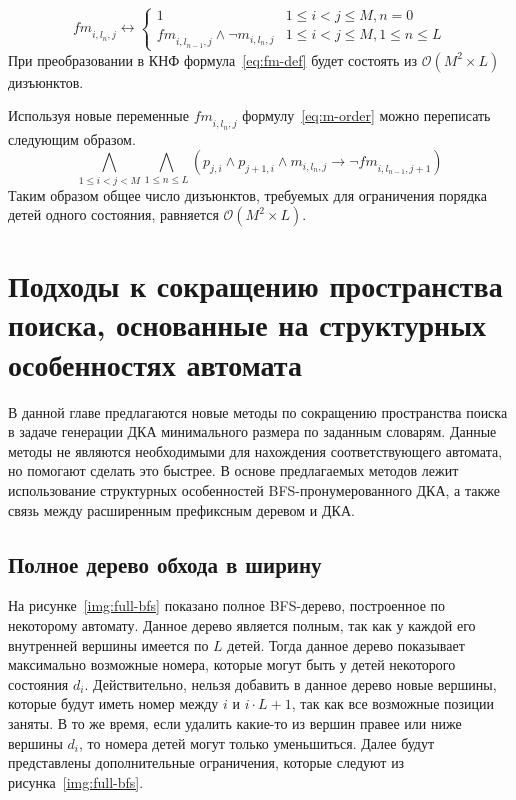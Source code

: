 \begin{equation}
\label{eq:fm-def}
  \mathit{fm}_{i,l_{n},j} \leftrightarrow 
    \begin{cases} 
      1                               & 1 \leq i < j \leq M, n = 0 \\
      \mathit{fm}_{i,l_{n - 1},j} \wedge \neg m_{i,l_{n},j}  & 1 \leq i < j \leq M, 1 \leq n \leq L
    \end{cases} 
\end{equation}
%
При преобразовании в КНФ формула~\eqref{eq:fm-def} будет состоять из $\mathcal{O}\left(M^{2} \times L\right)$ дизъюнктов.

Используя новые переменные $\mathit{fm}_{i,l_{n},j}$ формулу~\eqref{eq:m-order} можно переписать следующим образом.
%
\begin{equation}
\label{eq:m-order-tight}
  \bigwedge_{1 \leq i < j < M} \bigwedge_{1 \leq n \leq L} \left(p_{j,i} \wedge p_{j + 1, i} \wedge m_{i,l_{n}, j} \rightarrow \neg \mathit{fm}_{i, l_{n - 1}, j + 1}\right)
\end{equation}
%
Таким образом общее число дизъюнктов, требуемых для ограничения порядка детей одного состояния, равняется $\mathcal{O}\left(M^{2} \times L\right)$. 


\section{Подходы к сокращению пространства поиска, основанные на структурных особенностях автомата} 
\label{sec:space:pruning}

В данной главе предлагаются новые методы по сокращению пространства поиска в задаче генерации ДКА минимального размера по заданным словарям. 
Данные методы не являются необходимыми для нахождения соответствующего автомата, но помогают сделать это быстрее.
В основе предлагаемых методов лежит использование структурных особенностей BFS-пронумерованного ДКА, а также связь между расширенным префиксным деревом и ДКА.

\subsection{Полное дерево обхода в ширину}
\label{sec:space:pruning:bfs-tree}

На рисунке~\ref{img:full-bfs} показано полное BFS-дерево, построенное по некоторому автомату.
Данное дерево является полным, так как у каждой его внутренней вершины имеется по $L$ детей.
Тогда данное дерево показывает максимально возможные номера, которые могут быть у детей некоторого состояния $d_{i}$.
Действительно, нельзя добавить в данное дерево новые вершины, которые будут иметь номер между $i$ и $i \cdot L + 1$, так как все возможные позиции заняты.
В то же время, если удалить какие-то из вершин правее или ниже вершины $d_{i}$, то номера детей могут только уменьшиться.
Далее будут представлены дополнительные ограничения, которые следуют из рисунка~\ref{img:full-bfs}.

